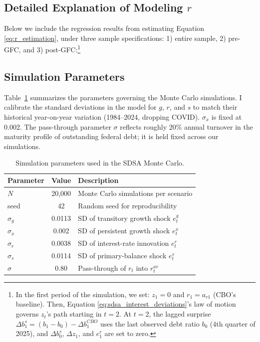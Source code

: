 \documentclass[12pt]{article}
\begin{document}
\subsection{Detailed Explanation of Modeling $r$}
\label{sec:detailed_explanation_r}

Below we include the regression results from estimating Equation \ref{eq:r_estimation}, under three sample specifications: 1) entire sample, 2) pre-GFC, and 3) post-GFC:\footnote{In the first period of the simulation, we set: $z_1 = 0$ and $r_1 = a_{r1}$ (CBO's baseline). Then, Equation \ref{eq:sdsa_interest_deviations}'s law of motion governs $z_t$'s path starting in $t = 2$. At $t = 2$, the lagged surprise $\Delta b^s_1 = (b_1 - b_0) - \Delta b^{CBO}_1$ uses the last observed debt ratio $b_0$ (4th quarter of 2025), and $\Delta b^s_0$, $\Delta z_1$, and $e^r_1$ are set to zero.}



\subsection{Simulation Parameters}
\label{sec:simulation_parameters}

Table~\ref{tab:simulation_parameters} summarizes the parameters governing the Monte Carlo simulations. I calibrate the standard deviations in the model for $g$, $r$, and $s$ to match their historical year-on-year variation (1984--2024, dropping COVID). $\sigma_x$ is fixed at 0.002. The pass-through parameter $\sigma$ reflects roughly 20\% annual turnover in the maturity profile of outstanding federal debt; it is held fixed across our simulations.

\begin{table}[htbp!]
    \centering
    \caption{Simulation parameters used in the SDSA Monte Carlo.}
    \label{tab:simulation_parameters}
    \begin{tabular}{lcl}
        \toprule
        \textbf{Parameter} & \textbf{Value} & \textbf{Description}                  \\
        \midrule
        $N$                & 20{,}000       & Monte Carlo simulations per scenario  \\
        seed               & 42             & Random seed for reproducibility       \\
        $\sigma_g$         & 0.0113         & SD of transitory growth shock $e^g_t$ \\
        $\sigma_x$         & 0.002          & SD of persistent growth shock $e^x_t$ \\
        $\sigma_r$         & 0.0038         & SD of interest-rate innovation $e^r_t$ \\
        $\sigma_s$         & 0.0114         & SD of primary-balance shock $e^s_t$   \\
        $\sigma$           & 0.80           & Pass-through of $r_t$ into $r^{av}_t$ \\
        \bottomrule
    \end{tabular}
\end{table}

\printbibliography
\end{document}
